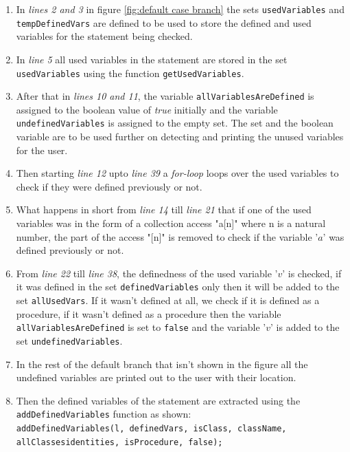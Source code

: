 \documentclass[11pt]{report}
\begin{document}
\begin{enumerate}
\item In \textsl{lines 2 and 3} in figure \ref{fig:default case branch} the sets \texttt{usedVariables} and \texttt{tempDefinedVars} are defined to be used to store the defined and used variables for the statement being checked.

\item In \textsl{line 5} all used variables in the statement are stored in the set \texttt{usedVariables} using the function \texttt{getUsedVariables}.

\item After that in \textsl{lines 10 and 11}, the variable \texttt{allVariablesAreDefined} is assigned to the boolean value of \textsl{true} initially and the variable \texttt{undefinedVariables} is assigned to the empty set. The set and the boolean variable are to be used further on detecting and printing the unused variables for the user.

\item Then starting \textsl{line 12} upto \textsl{line 39} a \textsl{for-loop} loops over the used variables to check if they were defined previously or not.

\item What happens in short from \textsl{line 14} till \textsl{line 21} that if one of the used variables was in the form of a collection access "a[n]" where n is a natural number, the part of the access "[n]" is removed to check if the variable '$a$' was defined previously or not.

\item From \textsl{line 22} till \textsl{line 38}, the definedness of the used variable '$v$' is checked, if it was defined in the set \texttt{definedVariables} only then it will be added to the set \texttt{allUsedVars}. If it wasn't defined at all, we check if it is defined as a procedure, if it wasn't defined as a procedure then the variable \texttt{allVariablesAreDefined} is set to \texttt{false} and the variable '$v$' is added to the set \texttt{undefinedVariables}.

\item In the rest of the default branch that isn't shown in the figure all the undefined variables are printed out to the user with their location.

\item Then the defined variables of the statement are extracted using the \texttt{addDefinedVariables} function as shown:
\\[0.2cm]
\hspace*{0.6cm}
\texttt{addDefinedVariables(l, definedVars, isClass, className,}
\\ 
\hspace*{4.7cm}	
	\texttt{allClassesidentities, isProcedure, false);}
\\
\end{enumerate}
\end{document}
